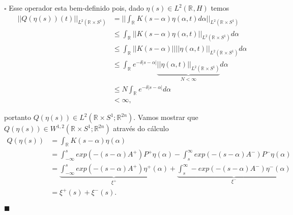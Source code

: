 \documentclass[12pt]{book}
\newenvironment{prova}[1]{$\square$ #1}{\hfill$\blacksquare$}
\newcommand{\circulo}{S^{1}}
\newcommand{\espacoLdois}[1]{L^{2}(#1)}
\newcommand{\espacosobolevgeral}[2]{W^{1,#1}(#2)}
\newcommand{\norma}[1]{||#1||}
\newcommand{\normagrande}[1]{\Big|\Big|#1\Big|\Big|}
\newcommand{\retacartesianocirculo}{\real{} \times \circulo}
\newcommand{\real}[1]{\mathbb{R}^{#1}}
\newcommand{\reta}{\real{}}
\begin{document}
\begin{prova}
		Esse operador esta bem-definido pois, dado $\eta(s) \in \espacoLdois{\reta, H}$ temos
		$$
		\begin{aligned}
		\norma{Q(\eta(s))(t)}_{\espacoLdois{\retacartesianocirculo}} &= \normagrande{\int_{\real{}}K(s-\alpha)\eta(\alpha, t)d\alpha}_{\espacoLdois{\retacartesianocirculo}}
		\\
		&\leq
		\int_{\reta}\norma{K(s-\alpha)\eta(\alpha, t)}_{\espacoLdois{\retacartesianocirculo}}d\alpha
		\\
		&\leq
		\int_{\reta}\norma{K(s-\alpha)}\norma{\eta(\alpha, t)}_{\espacoLdois{\retacartesianocirculo}}d\alpha
		\\
		&\leq
		\int_{\reta}e^{-\delta|s-\alpha|}  \underbrace{\norma{\eta(\alpha, t)}_{\espacoLdois{\retacartesianocirculo}}}_{N < \infty}d\alpha
		\\
		&\leq
		N\int_{\reta}e^{-\delta|s-\alpha|} d\alpha
		\\
		&< \infty,	
		\end{aligned}
		$$
		
		portanto $Q(\eta(s)) \in \espacoLdois{\retacartesianocirculo;\real{2n}}$. Vamos mostrar que $Q(\eta(s)) \in \espacosobolevgeral{2}{\retacartesianocirculo;\real{2n}}$ através do cálculo
		$$
		\begin{aligned}
		Q(\eta(s)) 
		&= \int_{\reta}K(s-\alpha)\eta(\alpha)
		\\
		&=\int_{-\infty}^{s}exp(-(s-\alpha)A^{+})P^{+}\eta(\alpha)-\int_{s}^{\infty}exp(-(s-\alpha)A^{-})P^{-}\eta(\alpha)
		\\
		&=\underbrace{\int_{-\infty}^{s}exp(-(s-\alpha)A^{+})\eta^{+}(\alpha)}_{\xi^{+}} +\underbrace{\int_{s}^{\infty}-exp(-(s-\alpha)A^{-})\eta^{-}(\alpha)}_{\xi^{-}}
		\\
		&= \xi^{+}(s)+\xi^{-}(s).
		\end{aligned}
		$$
		

\end{prova}
\end{document}

